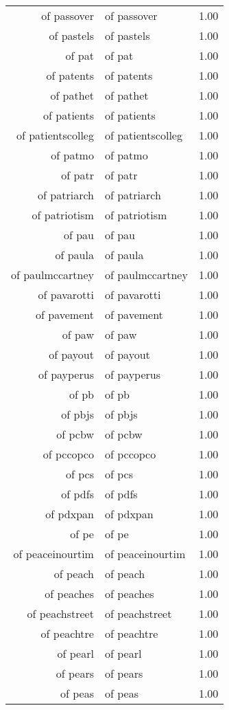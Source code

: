 \begin{table}[ht]
\begin{tabular}{rlr}
  of passover & of passover & 1.00 \\ 
  of pastels & of pastels & 1.00 \\ 
  of pat & of pat & 1.00 \\ 
  of patents & of patents & 1.00 \\ 
  of pathet & of pathet & 1.00 \\ 
  of patients & of patients & 1.00 \\ 
  of patientscolleg & of patientscolleg & 1.00 \\ 
  of patmo & of patmo & 1.00 \\ 
  of patr & of patr & 1.00 \\ 
  of patriarch & of patriarch & 1.00 \\ 
  of patriotism & of patriotism & 1.00 \\ 
  of pau & of pau & 1.00 \\ 
  of paula & of paula & 1.00 \\ 
  of paulmccartney & of paulmccartney & 1.00 \\ 
  of pavarotti & of pavarotti & 1.00 \\ 
  of pavement & of pavement & 1.00 \\ 
  of paw & of paw & 1.00 \\ 
  of payout & of payout & 1.00 \\ 
  of payperus & of payperus & 1.00 \\ 
  of pb & of pb & 1.00 \\ 
  of pbjs & of pbjs & 1.00 \\ 
  of pcbw & of pcbw & 1.00 \\ 
  of pccopco & of pccopco & 1.00 \\ 
  of pcs & of pcs & 1.00 \\ 
  of pdfs & of pdfs & 1.00 \\ 
  of pdxpan & of pdxpan & 1.00 \\ 
  of pe & of pe & 1.00 \\ 
  of peaceinourtim & of peaceinourtim & 1.00 \\ 
  of peach & of peach & 1.00 \\ 
  of peaches & of peaches & 1.00 \\ 
  of peachstreet & of peachstreet & 1.00 \\ 
  of peachtre & of peachtre & 1.00 \\ 
  of pearl & of pearl & 1.00 \\ 
  of pears & of pears & 1.00 \\ 
  of peas & of peas & 1.00 \\ 

\end{tabular}
\end{table}
